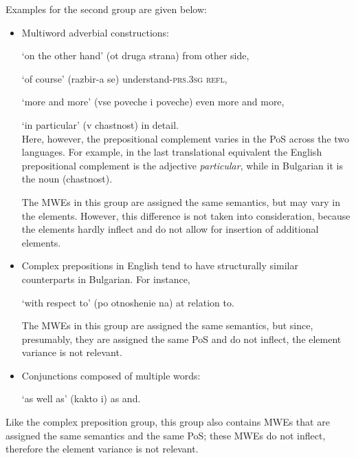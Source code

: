 \documentclass[output=paper]{langsci/langscibook}
\begin{document}
Examples for the second group are given below:

\begin{itemize}
\item Multiword adverbial constructions:

\osenovaitem `on the other hand' \textit{}  (ot druga strana) from other side,

\osenovaitem `of course'  \textit{} (razbir-a se) understand-\textsc{prs.3sg} \textsc{refl},

\osenovaitem `more and more'  \textit{} (vse poveche i poveche) even more and more,

\osenovaitem `in particular'  \textit{}  (v chastnost) in detail.\\
Here, however, the prepositional complement varies in the PoS across the two languages. For example, in the last translational equivalent the English prepositional complement is the adjective \textit{particular}, while in Bulgarian it is the  noun \textit{} (chastnost).

The MWEs in this group are assigned the same semantics, but may vary in the elements. However, this difference is not taken into consideration, because
the elements hardly inflect and do not
allow for insertion of additional elements.

\item Complex prepositions in English tend to have structurally similar counterparts in Bulgarian. For instance,

\osenovaitem `with respect to' \textit{} (po otnoshenie na) at relation to.

The MWEs in this group are assigned the same semantics, but since, presumably, they are assigned the same PoS and do not inflect, the element variance is not relevant.

\item Conjunctions composed of multiple words:

\osenovaitem `as well as'  \textit{}  (kakto i)  as and.
\end{itemize}
 
Like the complex preposition group, this group also contains MWEs that are assigned the same semantics and the same PoS; these MWEs do not inflect, therefore the element variance is not relevant.
 
\end{document}
